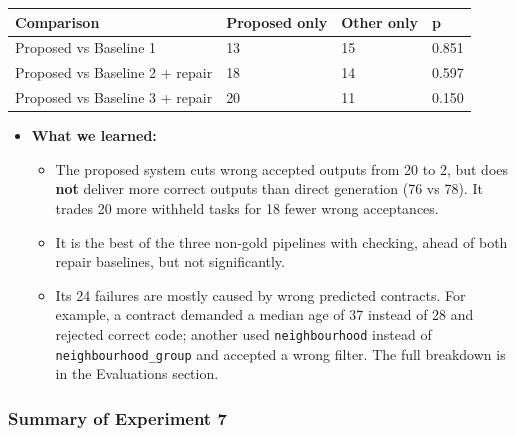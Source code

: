 \documentclass[11pt]{article}
\providecommand{\tightlist}{\setlength{\itemsep}{0pt}\setlength{\parskip}{0pt}}
\begin{document}
\begin{table}[!tp]
\centering\footnotesize\setlength{\tabcolsep}{3pt}\renewcommand{\arraystretch}{1.1}
\begin{tabularx}{\textwidth}{>{\raggedright\arraybackslash}Xlll}
\toprule
\textbf{Comparison} & \textbf{Proposed only} & \textbf{Other only} & \textbf{p} \\
\midrule
Proposed vs Baseline 1 & 13 & 15 & 0.851 \\
Proposed vs Baseline 2 + repair & 18 & 14 & 0.597 \\
Proposed vs Baseline 3 + repair & 20 & 11 & 0.150 \\
\bottomrule
\end{tabularx}
\end{table}

\begin{itemize}
\tightlist
\item
  \textbf{What we learned:}

  \begin{itemize}
  \tightlist
  \item
    The proposed system cuts wrong accepted outputs from 20 to 2, but
    does \textbf{not} deliver more correct outputs than direct
    generation (76 vs 78). It trades 20 more withheld tasks for 18 fewer
    wrong acceptances.
  \item
    It is the best of the three non-gold pipelines with checking, ahead
    of both repair baselines, but not significantly.
  \item
    Its 24 failures are mostly caused by wrong predicted contracts. For
    example, a contract demanded a median age of 37 instead of 28 and
    rejected correct code; another used \texttt{neighbourhood} instead
    of \texttt{neighbourhood\_\allowbreak{}group} and accepted a wrong
    filter. The full breakdown is in the Evaluations section.
  \end{itemize}
\end{itemize}

\subsubsection{Summary of Experiment 7}
\end{document}

